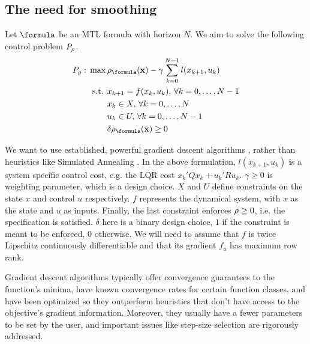 \subsection{The need for smoothing}
\label{sec:need for smoothing}
Let $\formula$ be an MTL formula with horizon $N$.
We aim to solve the following control problem $P_\rho$.
\begin{subequations}
\label{eq:general_ctrl}
\begin{align}
P_\rob:\, \max\, & \rob_{\formula}(\sstraj) - \gamma \sum_{k=0}^{N-1} l(x_{k+1},u_{k}) \label{eq:general ctrl obj}\\
\text{s.t. } & x_{k+1} = f(x_k,u_k), \, \forall k=0,\dotsc,N-1 \label{eq:general ctrl dyn}\\
 & x_k \in X, \, \forall k=0,\dotsc,N \label{eq:general ctrl X}\\
 & u_k \in U, \, \forall k=0,\dotsc,N-1 \label{eq:general ctrl U}\\
 & \delta \rob_{\formula}(\sstraj) \geq 0 \label{eq:general ctrl pos rob}
\end{align}
\end{subequations}

We want to use established, powerful gradient descent algorithms \cite{Polak97_Optim}, rather than heuristics like Simulated Annealing \cite{kirkpatrickV_SA83}. 
In the above formulation, $l(x_{k+1},u_{k})$ is a system specific control cost, e.g. the LQR cost $x_k'Qx_k + u_k'Ru_k$. $\gamma \geq 0$ is weighting parameter, which is a design choice. $X$ and $U$ define constraints on the state $x$ and control $u$ respectively. $f$ represents the dynamical system, with $x$ as the state and $u$ as inputs. Finally, the last constraint enforces $\rho \geq 0$, i.e. the specification is satisfied. 
$\delta$ here is a binary design choice, $1$ if the constraint is meant to be enforced, $0$ otherwise.
We will need to assume that $f$ is twice Lipschitz continuously differentiable and that its gradient $f_u$ has maximum row rank.

Gradient descent algorithms typically offer convergence guarantees to the function's minima, have known convergence rates for certain function classes, and have been optimized so they outperform heuristics that don't have access to the objective's gradient information.
Moreover, they usually have a fewer parameters to be set by the user, and important issues like step-size selection are rigorously addressed.

